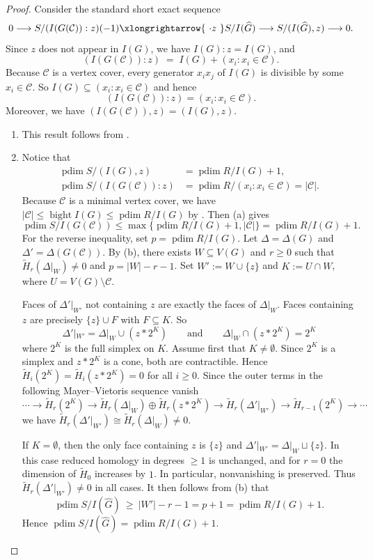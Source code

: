 \documentclass[12pt]{amsart}
\theoremstyle{plain}
\theoremstyle{definition}
\DeclareMathOperator{\pdim}{pdim}
\DeclareMathOperator{\bight}{bight}
\begin{document}
\begin{proof}
Consider the standard short exact sequence
\[
0 \longrightarrow S/(I(G(\mathcal C)):z)(-1) \xlongrightarrow{\ \cdot z\ } S/I(\widehat{G})
\longrightarrow S/(I(\widehat{G}),z) \longrightarrow 0.
\]
Since $z$ does not appear in $I(G)$, we have $I(G):z=I(G)$, and
\[
(I(G(\mathcal C)):z) \;=\; I(G) + (x_i : x_i\in \mathcal C).
\]
Because $\mathcal C$ is a vertex cover, every generator $x_ix_j$ of $I(G)$ is divisible by some
$x_i\in \mathcal C$. So $I(G)\subseteq (x_i:x_i\in \mathcal C)$ and hence
\[
(I(G(\mathcal C)):z)=(x_i:x_i\in \mathcal C).
\]
Moreover, we have $(I(G(\mathcal C)),z)=(I(G),z)$.
\begin{enumerate}
\item[(a)] This result follows from \cite[Lemma~1.5]{IndMatch}.
\item[(b)] Notice that
\begin{align*}
\pdim S/ (I(G),z) &=\pdim R/I(G)+1,\\
\pdim S/ (I(G(\mathcal C)):z) &= \pdim R/ (x_i : x_i\in \mathcal C) = |\mathcal C|.
\end{align*}
Because $\mathcal C$ is a minimal vertex cover, we have $|\mathcal C|\le \bight I(G) \le \pdim R/I(G)$  by .  Then (a) gives
\[
\pdim S/ I(G(\mathcal C)) \leq \max \{\pdim R/I(G)+1 , |\mathcal C|\}
= \pdim R/I(G)+1.
\]
For the reverse inequality, set $p=\pdim R/I(G)$. Let $\Delta=\Delta(G)$ and
$\Delta'=\Delta(G(\mathcal C))$. By (b), there exists $W\subseteq V(G)$ and $r\ge 0$
such that $\widetilde H_r(\Delta|_W)\neq 0$ and $p=|W|-r-1$. Set $W':=W\cup\{z\}$ and
$K:=U\cap W$, where $U=V(G)\setminus \mathcal C$.

Faces of $\Delta'|_{W'}$ not containing $z$ are exactly the faces of $\Delta|_W$.
Faces containing $z$ are precisely $\{z\}\cup F$ with $F\subseteq K$. So
\[
\Delta'|_{W'}=\Delta|_W  \cup  (z*2^{K})
\qquad\text{and}\qquad
\Delta|_W\cap(z*2^{K})=2^{K}
\]
where $2^K$ is the full simplex on $K$.
Assume first that $K\neq\emptyset$. Since $2^{K}$ is a simplex and $z*2^{K}$ is a cone, both are
contractible. Hence $\widetilde H_i(2^{K})=\widetilde H_i(z*2^{K})=0$ for all $i\ge 0$.
Since the outer terms in the following Mayer--Vietoris sequence vanish
\[
\cdots \longrightarrow
\widetilde H_r(2^{K})
\longrightarrow
\widetilde H_r(\Delta|_W)\oplus \widetilde H_r(z*2^{K})
\longrightarrow
\widetilde H_r(\Delta'|_{W'})
\longrightarrow
\widetilde H_{r-1}(2^{K})
\longrightarrow \cdots 
\]
we have
$\widetilde H_r(\Delta'|_{W'})\cong \widetilde H_r(\Delta|_W)\neq 0$.

If $K=\emptyset$, then the only face containing $z$ is $\{z\}$ and 
$\Delta'|_{W'}=\Delta|_W\sqcup\{z\}$. In this case reduced homology in degrees $\ge 1$ is unchanged,
and for $r=0$ the dimension of $\widetilde H_0$ increases by $1$. In particular, nonvanishing is
preserved. Thus $\widetilde H_r(\Delta'|_{W'})\neq 0$ in all cases. It then follows from (b) that
\[
\pdim S/I(\widehat{G})\ \ge\ |W'|-r-1= p+1=\pdim R/I(G)+1.
\]
Hence $\pdim S/I(\widehat{G})=\pdim R/I(G)+1$. \qedhere
\end{enumerate}
\end{proof}
\end{document}
